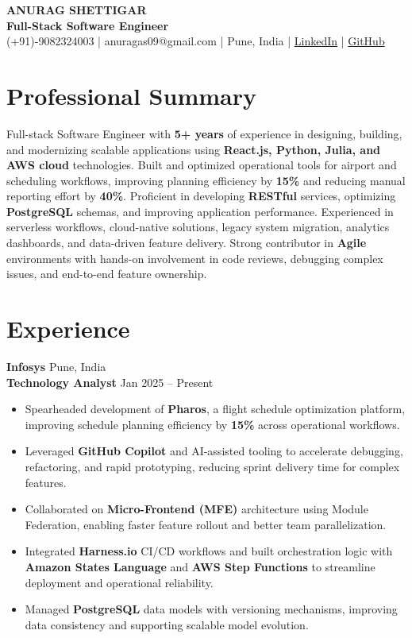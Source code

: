 \documentclass[10pt,a4paper]{article}
\date{Last updated: July 18, 2026}
\begin{document}
\begin{center}
    {\LARGE \textbf{ANURAG SHETTIGAR}}\\
     {\textbf{Full-Stack Software Engineer}}\\
    (+91)-9082324003 |  anuragas09@gmail.com |
    Pune, India | 
    \href{https://www.linkedin.com/in/anurag-shettigar/}{LinkedIn}  | 
    \href{https://github.com/Anoteros09}{GitHub}
\end{center}

\section*{Professional Summary}

Full-stack Software Engineer with \textbf{5+ years} of experience in designing, building, and modernizing scalable applications using \textbf{React.js, Python, Julia, and AWS cloud} technologies. Built and optimized operational tools for airport and scheduling workflows, improving planning efficiency by \textbf{15\%} and reducing manual reporting effort by \textbf{40\%}. Proficient in developing \textbf{RESTful} services, optimizing \textbf{PostgreSQL} schemas, and improving application performance. Experienced in serverless workflows, cloud-native solutions, legacy system migration, analytics dashboards, and data-driven feature delivery. Strong contributor in \textbf{Agile} environments with hands-on involvement in code reviews, debugging complex issues, and end-to-end feature ownership.

\section*{Experience}

\textbf{Infosys} \hfill Pune, India \\
\textbf{Technology Analyst} \hfill Jan 2025 -- Present

\begin{itemize}[leftmargin=*]
\item Spearheaded development of \textbf{Pharos}, a flight schedule optimization platform, improving schedule planning efficiency by \textbf{15\%} across operational workflows.
\item Leveraged \textbf{GitHub Copilot} and AI-assisted tooling to accelerate debugging, refactoring, and rapid prototyping, reducing sprint delivery time for complex features.
\item Collaborated on \textbf{Micro-Frontend (MFE)} architecture using Module Federation, enabling faster feature rollout and better team parallelization.
\item Integrated \textbf{Harness.io} CI/CD workflows and built orchestration logic with \textbf{Amazon States Language} and \textbf{AWS Step Functions} to streamline deployment and operational reliability.
\item Managed \textbf{PostgreSQL} data models with versioning mechanisms, improving data consistency and supporting scalable model evolution.
\end{itemize}
\end{document}
